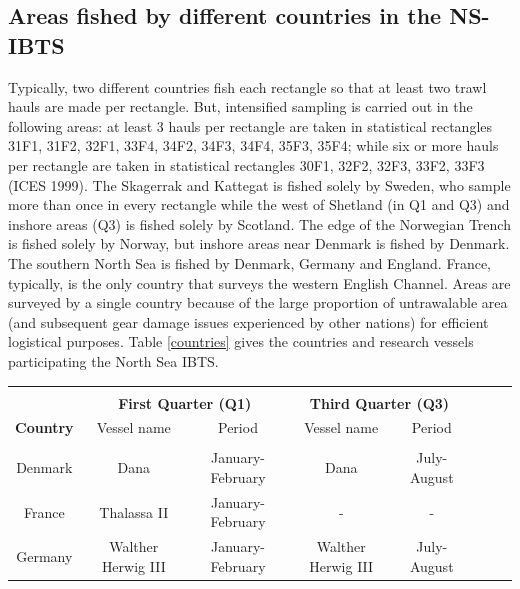 \documentclass[a4paper 12pt]{article}
\numberwithin{equation}{section}
\begin{document}

\begin{appendices}
\section{Areas fished by different countries in the NS-IBTS}
\label{areasfishedappendix}
Typically, two different countries fish each rectangle so that at least two trawl hauls are made per rectangle. But, intensified sampling is carried out in the following areas: at least 3 hauls per rectangle are taken in statistical rectangles  31F1, 31F2, 32F1, 33F4, 34F2, 34F3, 34F4, 35F3, 35F4; while six or more hauls per rectangle are taken in statistical rectangles  30F1, 32F2, 32F3, 33F2, 33F3 (ICES 1999).  The Skagerrak and Kattegat is fished solely by Sweden, who sample more than once in every rectangle while the west of Shetland (in Q1 and Q3) and inshore areas (Q3) is fished solely by Scotland. The edge of the Norwegian Trench is fished solely by Norway, but inshore areas near Denmark is fished by Denmark. The southern North Sea is fished by Denmark, Germany and England. France, typically, is the only country that surveys the western English Channel. Areas are surveyed by a single country because of the large proportion of untrawalable area (and subsequent gear damage issues experienced by other nations)  for efficient logistical purposes. Table \ref{countries} gives the countries and research vessels participating the North Sea IBTS.\\
\begin{small}
\begin{table}[h!]
\centering
{}
\begin{tabular}{cccccccc}
\hline \\[0.1ex]
  & \multicolumn{2}{c}{\bf First Quarter (Q1)} & \multicolumn{2}{c}{\bf Third Quarter (Q3)}\\[1.5ex]
{\bf Country }  & Vessel name & Period    & Vessel name & Period  \\[0.5ex]
\hline \\[0.5ex]
Denmark  &   Dana   &   January-February  & Dana & July-August    \\[1ex]
France  & Thalassa II & January-February & - & -   \\[1ex]
Germany   &  Walther  Herwig III & January-February   &   Walther  Herwig III & July-August \\[1ex]

\end{tabular}
\end{table}
\end{small}
\end{appendices}
\end{document}
